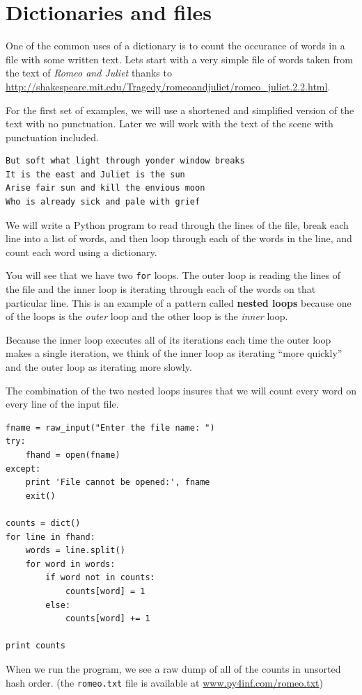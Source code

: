 \documentclass[10pt]{book}
\begin{document}
\section{Dictionaries and files}

One of the common uses of a dictionary is to count the occurance
of words in a file with some written text.  
Lets start with a very simple file of
words taken from the text of {\em Romeo and Juliet}
thanks to 
\url{http://shakespeare.mit.edu/Tragedy/romeoandjuliet/romeo_juliet.2.2.html}.

For the first set of examples, we will use a shortened and simplified version
of the text with no punctuation.  Later we will work with the text of the 
scene with punctuation included.

\beforeverb
\begin{verbatim}
But soft what light through yonder window breaks
It is the east and Juliet is the sun
Arise fair sun and kill the envious moon
Who is already sick and pale with grief
\end{verbatim}
\afterverb
%
We will write a Python program to read through the lines of the file, 
break each line into a list of words, and then loop through each 
of the words in the line, and count each word using a dictionary.

You will see that we have two {\tt for} loops.  The outer loop is reading the
lines of the file and the inner loop is iterating through each
of the words on that particular line.  This is an example
of a pattern called {\bf nested loops} because one of the loops
is the {\em outer} loop and the other loop is the {\em inner}
loop.  

Because the inner loop executes all of its iterations each time
the outer loop makes a single iteration, we think of the inner
loop as iterating ``more quickly'' and the outer loop as iterating 
more slowly.

The combination of the two nested loops insures that we will count
every word on every line of the input file.

\beforeverb
\begin{verbatim}
fname = raw_input("Enter the file name: ")
try:
    fhand = open(fname)
except:
    print 'File cannot be opened:', fname
    exit()

counts = dict()
for line in fhand:
    words = line.split()
    for word in words:
        if word not in counts:
            counts[word] = 1
        else:
            counts[word] += 1

print counts
\end{verbatim}
\afterverb
%
When we run the program, we see a raw dump of all of the counts in unsorted
hash order.
(the {\tt romeo.txt} file is available at
\url{www.py4inf.com/romeo.txt})
\end{document}
